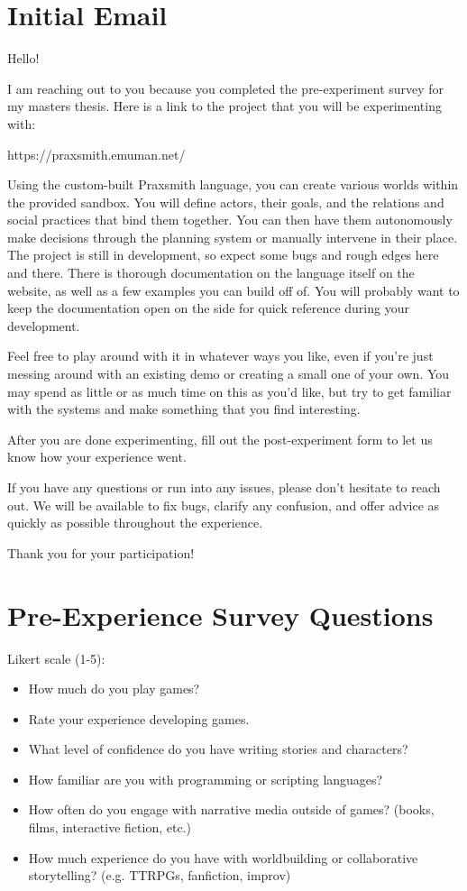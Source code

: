 \section{Initial Email}

Hello!

I am reaching out to you because you completed the pre-experiment survey for my
masters thesis. Here is a link to the project that you will be experimenting with:

https://praxsmith.emuman.net/

Using the custom-built Praxsmith language, you can create various worlds within
the provided sandbox. You will define actors, their goals, and the relations and
social practices that bind them together. You can then have them autonomously
make decisions through the planning system or manually intervene in their place.
The project is still in development, so expect some bugs and rough edges here and
there. There is thorough documentation on the language itself on the website, as
well as a few examples you can build off of. You will probably want to keep the
documentation open on the side for quick reference during your development.

Feel free to play around with it in whatever ways you like, even if you're
just messing around with an existing demo or creating a small one of your own.
You may spend as little or as much time on this as you'd like, but try to get
familiar with the systems and make something that you find interesting.

After you are done experimenting, fill out the post-experiment form to let us
know how your experience went.

If you have any questions or run into any issues, please don't hesitate to reach out.
We will be available to fix bugs, clarify any confusion, and offer advice as quickly
as possible throughout the experience.

Thank you for your participation!

\section{Pre-Experience Survey Questions}

Likert scale (1-5):

\begin{itemize}
    \item How much do you play games?
    \item Rate your experience developing games.
    \item What level of confidence do you have writing stories and characters?
    \item How familiar are you with programming or scripting languages?
    \item How often do you engage with narrative media outside of games? (books, films, interactive fiction, etc.)
    \item How much experience do you have with worldbuilding or collaborative storytelling? (e.g. TTRPGs, fanfiction, improv)
\end{itemize}

